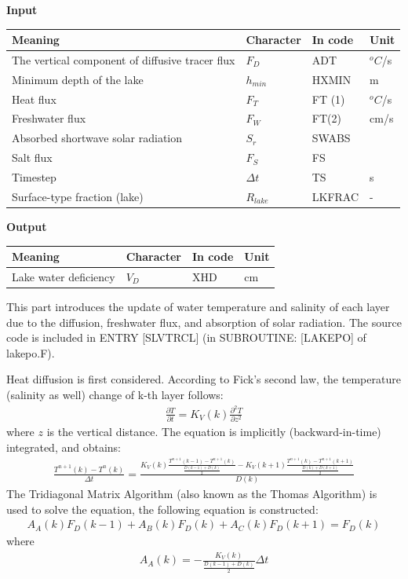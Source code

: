 \textbf{Input}

\begin{longtable}[]{@{}llll@{}}
\toprule\noalign{}
Meaning & Character & In code & Unit \\
\midrule\noalign{}
\endhead
\bottomrule\noalign{}
\endlastfoot
The vertical component of diffusive tracer flux & \(F_{D}\) & ADT & \(^{o}C\)/s \\
Minimum depth of the lake & \(h_{min}\) & HXMIN & m \\
Heat flux & \(F_{T}\) & FT (1) & \(^{o}C\)/s \\
Freshwater flux & \(F_{W}\) & FT(2) & cm/s \\
Absorbed shortwave solar radiation & \(S_{r}\) & SWABS & \\
Salt flux & \(F_{S}\) & FS & \\
Timestep & \(\Delta t\) & TS & s \\
Surface-type fraction (lake) & \(R_{lake}\) & LKFRAC & - \\
\end{longtable}

\textbf{Output}

\begin{longtable}[]{@{}llll@{}}
\toprule\noalign{}
Meaning & Character & In code & Unit \\
\midrule\noalign{}
\endhead
\bottomrule\noalign{}
\endlastfoot
Lake water deficiency & \(V_{D}\) & XHD & cm \\
\end{longtable}

This part introduces the update of water temperature and salinity of each layer due to the diffusion, freshwater flux, and absorption of solar radiation. The source code is included in ENTRY
{[}SLVTRCL{]} (in SUBROUTINE: {[}LAKEPO{]} of lakepo.F).

Heat diffusion is first considered. According to Fick's second law, the temperature (salinity as well) change of k-th layer follows: \begin{eqnarray}
\frac{\partial T}{\partial t}=K_{V}(k)\frac{\partial^2 T}{\partial z^2}
\end{eqnarray} where \(z\) is the vertical distance. The equation is implicitly (backward-in-time) integrated, and obtains: \begin{eqnarray}
\frac{T^{n+1}(k)-T^{n}(k)}{\Delta t}=\frac{K_{V}(k)\frac{T^{n+1}(k-1)-T^{n+1}(k)}{\frac{D(k-1)+D(k)}{2}}-K_{V}(k+1)\frac{T^{n+1}(k)-T^{n+1}(k+1)}{\frac{D(k)+D(k+1)}{2}}}{D(k)}
\end{eqnarray} The Tridiagonal Matrix Algorithm (also known as the Thomas Algorithm) is used to solve the equation, the following equation is constructed: \begin{eqnarray}
A_{A}(k)F_{D}(k-1)+A_{B}(k)F_{D}(k)+A_{C}(k)F_{D}(k+1)=F_{D}(k)
\end{eqnarray} where \begin{eqnarray}
A_{A}(k)=-\frac{K_{V}(k)}{\frac{D(k-1)+D(k)}{2}}\Delta t
\end{eqnarray}

